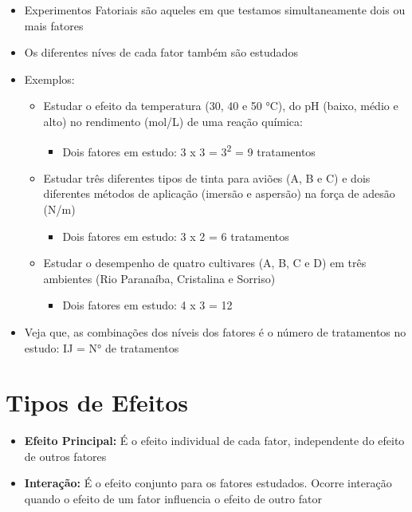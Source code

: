 \documentclass[
]{book}
\providecommand{\tightlist}{%
  \setlength{\itemsep}{0pt}\setlength{\parskip}{0pt}}
\begin{document}
\begin{itemize}
\item
  Experimentos Fatoriais são aqueles em que testamos simultaneamente dois ou mais fatores
\item
  Os diferentes níves de cada fator também são estudados
\item
  Exemplos:

  \begin{itemize}
  \tightlist
  \item
    Estudar o efeito da temperatura (30, 40 e 50 °C), do pH (baixo, médio e alto) no rendimento (mol/L) de uma reação química:

    \begin{itemize}
    \tightlist
    \item
      Dois fatores em estudo: 3 x 3 = 3\textsuperscript{2} = 9 tratamentos
    \end{itemize}
  \item
    Estudar três diferentes tipos de tinta para aviões (A, B e C) e dois diferentes métodos de aplicação (imersão e aspersão) na força de adesão (N/m)

    \begin{itemize}
    \tightlist
    \item
      Dois fatores em estudo: 3 x 2 = 6 tratamentos
    \end{itemize}
  \item
    Estudar o desempenho de quatro cultivares (A, B, C e D) em três ambientes (Rio Paranaíba, Cristalina e Sorriso)

    \begin{itemize}
    \tightlist
    \item
      Dois fatores em estudo: 4 x 3 = 12
    \end{itemize}
  \end{itemize}
\item
  Veja que, as combinações dos níveis dos fatores é o número de tratamentos no estudo: IJ = N° de tratamentos
\end{itemize}

\section{Tipos de Efeitos}\label{tipos-de-efeitos}

\begin{itemize}
\tightlist
\item
  \textbf{Efeito Principal:} É o efeito individual de cada fator, independente do efeito de outros fatores
\item
  \textbf{Interação:} É o efeito conjunto para os fatores estudados. Ocorre interação quando o efeito de um fator influencia o efeito de outro fator
\end{itemize}
\end{document}
